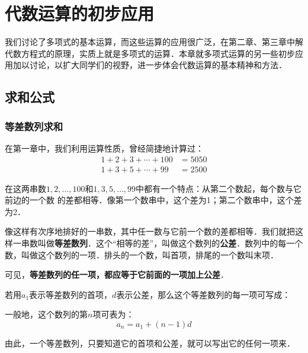 \chapter{代数运算的初步应用}

我们讨论了多项式的基本运算，而这些运算的应用很广泛，在第二章、第三章中解代数方程式的原理，实质上就是多项式的运算．本章就多项式运算的另一些初步应用加以讨论，以扩大同学们的视野，进一步体会代数运算的基本精神和方法．
\section{求和公式}
\subsection{等差数列求和}
在第一章中，我们利用运算性质，曾经简捷地计算过：
\[\begin{split}
    1+2+3+\cdots+100&=5050\\
    1+3+5+\cdots+99&=2500
\end{split}\]

在这两串数$1, 2,\ldots,100$和$1, 3, 5,\ldots,99$中都有一个特点：从第二个数起，每个数与它前边的一个数
的差都相等．像第一个数串中，这个差为1；第二个数串中，这个差为2．

像这样有次序地排好的一串数，其中任一数与它前一个数的差都相等．我们就把这样一串数叫做\textbf{等差数列}．这个“相等的差”，叫做这个数列的\textbf{公差}．数列中的每一个数，叫做这个数列的一项．排头的一个数，叫首项，排尾的一个数叫末项．

可见，\textbf{等差数列的任一项，都应等于它前面的一项加上公差}．

若用$a_1$表示等差数列的首项，$d$表示公差，那么这个等差数列的每一项可写成：
\begin{center}
\end{center}

一般地，这个数列的第$n$项可表为：
\[a_n=a_1+ (n-1) d\]

由此，一个等差数列，只要知道它的首项和公差，就可以写出它的任何一项来．

